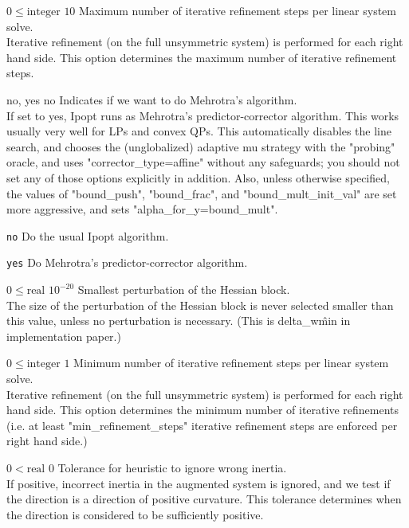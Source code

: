 %
{$0\leq\textrm{integer}$}%
{$10$}%
{Maximum number of iterative refinement steps per linear system solve.\\
Iterative refinement (on the full unsymmetric system) is performed for each right hand side.  This option determines the maximum number of iterative refinement steps.}%
{}

%
{no, yes}%
{no}%
{Indicates if we want to do Mehrotra's algorithm.\\
If set to yes, Ipopt runs as Mehrotra's predictor-corrector algorithm. This works usually very well for LPs and convex QPs.  This automatically disables the line search, and chooses the (unglobalized) adaptive mu strategy with the "probing" oracle, and uses "corrector\_type=affine" without any safeguards; you should not set any of those options explicitly in addition.  Also, unless otherwise specified, the values of "bound\_push", "bound\_frac", and "bound\_mult\_init\_val" are set more aggressive, and sets "alpha\_for\_y=bound\_mult".}%
{\begin{list}{}{
\setlength{\parsep}{0em}
\setlength{\leftmargin}{5ex}
\setlength{\labelwidth}{2ex}
\setlength{\itemindent}{0ex}
\setlength{\topsep}{0pt}}
\item[\texttt{no}] Do the usual Ipopt algorithm.
\item[\texttt{yes}] Do Mehrotra's predictor-corrector algorithm.
\end{list}
}

%
{$0\leq\textrm{real}$}%
{$10^{-20}$}%
{Smallest perturbation of the Hessian block.\\
The size of the perturbation of the Hessian block is never selected smaller than this value, unless no perturbation is necessary. (This is delta\_w\^min in implementation paper.)}%
{}

%
{$0\leq\textrm{integer}$}%
{$1$}%
{Minimum number of iterative refinement steps per linear system solve.\\
Iterative refinement (on the full unsymmetric system) is performed for each right hand side.  This option determines the minimum number of iterative refinements (i.e. at least "min\_refinement\_steps" iterative refinement steps are enforced per right hand side.)}%
{}

%
{$0<\textrm{real}$}%
{$0$}%
{Tolerance for heuristic to ignore wrong inertia.\\
If positive, incorrect inertia in the augmented system is ignored, and we test if the direction is a direction of positive curvature.  This tolerance determines when the direction is considered to be sufficiently positive.}%
{}

